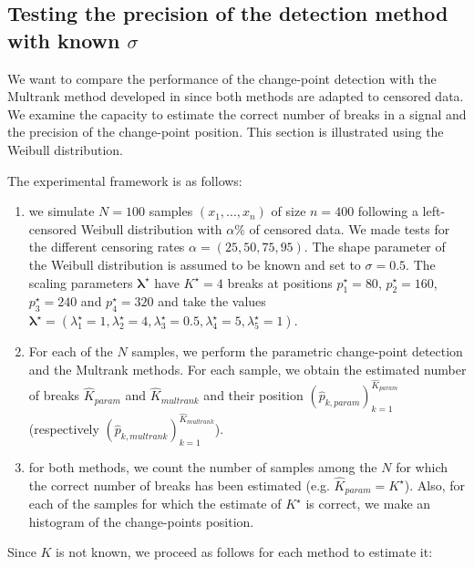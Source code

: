 \subsection{Testing the precision of the detection method with known $\sigma$}

We want to compare the performance of the change-point detection with the Multrank method developed in \cite{lung2015} since both methods are adapted to censored data. We examine the capacity to estimate the correct number of breaks in a signal and the precision of the change-point position. This section is illustrated using the Weibull distribution.   

The experimental framework is as follows: 
    \begin{enumerate}
        \item we simulate $N=100$ samples $(x_1,...,x_n)$ of size $n=400$  following a left-censored Weibull distribution with $\alpha\%$ of censored data. We made tests for the different censoring rates $\alpha = (25,50,75,95)$. The shape parameter of the Weibull distribution is assumed to be known and set to $\sigma=0.5$. The scaling parameters $\bm{\lambda^\star}$ have $K^\star=4$ breaks at positions $p^\star_1 = 80$, $p^\star_2 = 160$, $p^\star_3 = 240$ and $p^\star_4 = 320$ and take the values $\bm{\lambda^\star}=(\lambda^\star_1 = 1, \lambda^\star_2 = 4, \lambda^\star_3 = 0.5, \lambda^\star_4 = 5, \lambda^\star_5 = 1)$. 
        \item For each of the $N$ samples, we perform the parametric change-point detection and the Multrank methods. For each sample, we obtain the estimated number of breaks $\hat K_{param}$ and $\hat K_{multrank}$ and their position $(\hat{p}_{k,param})_{k = 1}^{\hat K_{param}}$ (respectively $(\hat{p}_{k,multrank})_{k = 1}^{\hat K_{multrank}}$).
        \item for both methods, we count the number of samples among the $N$ for which the correct number of breaks has been estimated (e.g. $\hat K_{param} = K^\star$). Also, for each of the samples for which the estimate of $K^\star$ is correct, we make an histogram of the change-points position. 
    \end{enumerate}
Since $K$ is not known, we proceed as follows for each method to estimate it:
